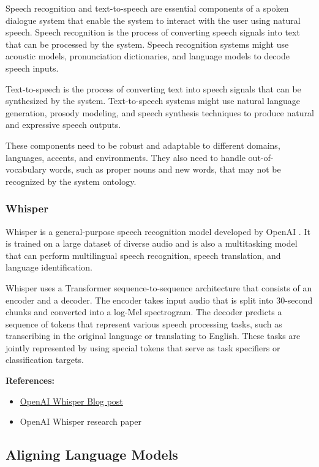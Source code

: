 \documentclass[11pt, a4paper]{amsart}
\begin{document}
Speech recognition and text-to-speech are essential components of a spoken dialogue system that enable the system to interact with the user using natural speech.
Speech recognition is the process of converting speech signals into text that can be processed by the system.
Speech recognition systems might use acoustic models, pronunciation dictionaries, and language models to decode speech inputs.

Text-to-speech is the process of converting text into speech signals that can be synthesized by the system.
Text-to-speech systems might use natural language generation, prosody modeling, and speech synthesis techniques to produce natural and expressive speech outputs.

These components need to be robust and adaptable to different domains, languages, accents, and environments.
They also need to handle out-of-vocabulary words, such as proper nouns and new words, that may not be recognized by the system ontology.

\subsubsection{Whisper}

Whisper is a general-purpose speech recognition model developed by OpenAI \cite{radford2022robust}.
It is trained on a large dataset of diverse audio and is also a multitasking model that can perform multilingual speech recognition, speech translation, and language identification.

Whisper uses a Transformer sequence-to-sequence architecture that consists of an encoder and a decoder.
The encoder takes input audio that is split into 30-second chunks and converted into a log-Mel spectrogram.
The decoder predicts a sequence of tokens that represent various speech processing tasks, such as transcribing in the original language or translating to English.
These tasks are jointly represented by using special tokens that serve as task specifiers or classification targets.

\noindent \textbf{References:}
\begin{itemize}
	\item \href{https://openai.com/research/whisper}{OpenAI Whisper Blog post}
	\item OpenAI Whisper research paper \cite{radford2022robust}
\end{itemize}


\subsection{Aligning Language Models}
\end{document}
